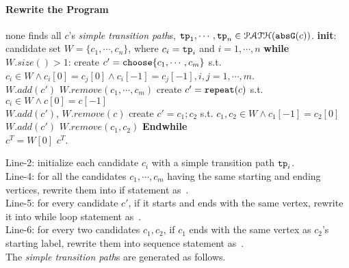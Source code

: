 \paragraph{Rewrite the Program}
\begin{algorithmic}[1]
    \REQUIRE none
    \STATE finds all $c$'s \emph{simple transition path}s, $\mathtt{tp}_1, \cdots, \mathtt{tp}_n \in \mathcal{PATH}(\mathtt{abs}{\mathtt{G}}(c))$.
    \STATE \textbf{init}: candidate set $W = \{c_1, \cdots, c_n\}$, where $c_i = \mathtt{tp}_i$ and $i = 1, \cdots, n$
    \STATE \textbf{while} $W.size()> 1$:
    \STATE \quad create $c' = \rpchoose{c_1, \cdots, c_m}$ 
    s.t. $c_i \in W \land c_i[0] = c_j[0] \land c_i[-1] = c_j[-1], i, j = 1, \cdots, m$.
    \\ \quad $W.add(c')$ \qquad $W.remove(c_1, \cdots, c_m)$
    \STATE
    \quad create $c' = \mathtt{repeat}(c)$ s.t. $c_i \in W \land c[0] = c[-1]$
    \\ \quad $W.add(c')$, \qquad $W.remove(c)$
    \STATE \quad create $c' = c_1; c_2$ s.t. $c_1, c_2 \in W \land c_1[-1] = c_2[0]$
    \\
    \quad $W.add(c')$ \qquad $W.remove(c_1, c_2)$
    \STATE \textbf{Endwhile}
    \\ $c^T = W[0]$
    \RETURN $c^T$.
\end{algorithmic}
%
Line-2: initialize each candidate $c_i$ with a simple transition path $\mathtt{tp}_i$.
\\
Line-4: for all the candidates $c_1, \cdots, c_m$ having the same starting and ending vertices, rewrite them into if statement as~\cite{GulwaniJK09}.
\\
Line-5: for every candidate $c'$, if it starts and ends with the same vertex, rewrite it into while loop statement as~\cite{GulwaniJK09}.
\\
Line-6: for every two candidates $c_1, c_2$, if $c_1$ ends with the same vertex as $c_2$'s starting label, rewrite them into sequence statement as~\cite{GulwaniJK09}.
\\
The \emph{simple transition path}s are generated as follows.
